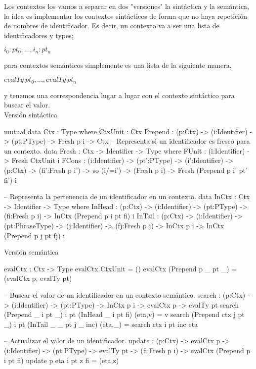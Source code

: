 Los contextos los vamos a separar en dos "versiones" la sint\'actica
y la semántica, la idea es implementar los contextos sint\'acticos de
forma que no haya repetición de nombres de identificador. Es decir,
un contexto va a ser una lista de identificadores y types;

\begin{center}
$i_0 : pt_0, \ldots , i_n:pt_n$
\end{center}

para contextos semánticos simplemente es una lista de la siguiente manera,

\begin{center}
$evalTy \ pt_0, \ldots , evalTy \ pt_n$
\end{center}

y tenemos una correspondencia lugar a lugar con el contexto sintáctico para
buscar el valor.\\

\noindent Versi\'on sint\'actica
\begin{code}
mutual
    data Ctx : Type where
        CtxUnit : Ctx
        Prepend : (p:Ctx) -> (i:Identifier) -> (pt:PType) -> 
                  Fresh p i -> Ctx
    -- Representa si un identificador es fresco para un contexto.
    data Fresh : Ctx -> Identifier -> Type where
        FUnit : (i:Identifier) -> Fresh CtxUnit i
        FCons : (i:Identifier) -> (pt':PType) -> (i':Identifier) -> 
                (p:Ctx) -> (fi':Fresh p i') -> so (i/=i') -> (Fresh p i) -> 
                Fresh (Prepend p i' pt' fi') i

-- Representa la pertenencia de un identificador en un contexto.
data InCtx : Ctx -> Identifier -> Type where
    InHead : (p:Ctx) -> (i:Identifier) -> (pt:PType) -> 
             (fi:Fresh p i) -> InCtx (Prepend p i pt fi) i
    InTail : (p:Ctx) -> (i:Identifier) -> (pt:PhraseType) -> 
             (j:Identifier) -> (fj:Fresh p j) -> 
             InCtx p i -> InCtx (Prepend p j pt fj) i
\end{code}

\newpage

\noindent Versi\'on sem\'antica
\begin{code}
evalCtx : Ctx -> Type
evalCtx CtxUnit = ()
evalCtx (Prepend p _ pt _) = (evalCtx p, evalTy pt)

-- Buscar el valor de un identificador en un contexto semántico.
search : (p:Ctx) -> (i:Identifier) -> (pt:PType) ->
         InCtx p i -> evalCtx p -> evalTy pt
search (Prepend _ i pt _) i pt (InHead _ i pt fi) (eta,v) = v
search (Prepend ctx j pt _) i pt (InTail _ _ pt j _ inc) (eta,_) = search ctx i pt inc eta

-- Actualizar el valor de un identificador.
update : (p:Ctx) -> evalCtx p -> (i:Identifier) -> 
         (pt:PType) -> evalTy pt -> (fi:Fresh p i) -> evalCtx (Prepend p i pt fi)
update p eta i pt z fi = (eta,z)
\end{code}

